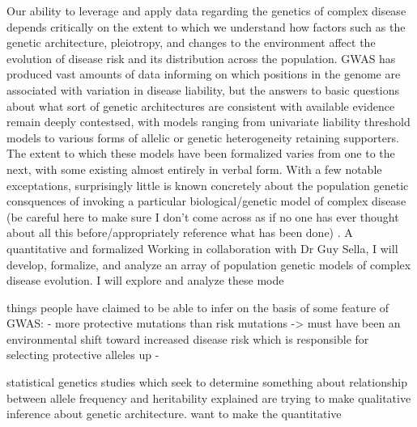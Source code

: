 \documentclass[a4paper,10pt]{article}
\newcommand{\jb}[1]{{\color{blue} (#1)} }
\begin{document}
Our ability to leverage and apply data regarding the genetics of complex disease depends critically on the extent to which we understand how factors such as the genetic architecture, pleiotropy, and changes to the environment affect the evolution of disease risk and its distribution across the population.
GWAS has produced vast amounts of data informing on which positions in the genome are associated with variation in disease liability, but the answers to basic questions about what sort of genetic architectures are consistent with available evidence remain deeply contestsed, with models ranging from univariate liability threshold models to various forms of allelic or genetic heterogeneity retaining supporters.
The extent to which these models have been formalized varies from one to the next, with some existing almost entirely in verbal form.
With a few notable exceptations, surprisingly little is known concretely about the population genetic consquences of invoking a particular biological/genetic model of complex disease \jb{be careful here to make sure I don't come across as if no one has ever thought about all this before/appropriately reference what has been done}.
A quantitative and formalized
Working in collaboration with Dr Guy Sella, I will develop, formalize, and analyze an array of population genetic models of complex disease evolution. I will explore and analyze these mode

things people have claimed to be able to infer on the basis of some feature of GWAS:
- more protective mutations than risk mutations -> must have been an environmental shift toward increased disease risk which is responsible for selecting protective alleles up
-

statistical genetics studies which seek to determine something about relationship between allele frequency and heritability explained are trying to make qualitative inference about genetic architecture. want to make the quantitative
\end{document}
